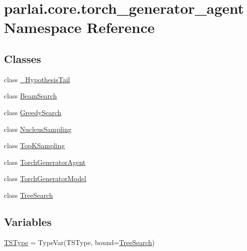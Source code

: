 \hypertarget{namespaceparlai_1_1core_1_1torch__generator__agent}{}\section{parlai.\+core.\+torch\+\_\+generator\+\_\+agent Namespace Reference}
\label{namespaceparlai_1_1core_1_1torch__generator__agent}
\subsection*{Classes}
\begin{DoxyCompactItemize}
\item 
class \hyperlink{classparlai_1_1core_1_1torch__generator__agent_1_1__HypothesisTail}{\+\_\+\+Hypothesis\+Tail}
\item 
class \hyperlink{classparlai_1_1core_1_1torch__generator__agent_1_1BeamSearch}{Beam\+Search}
\item 
class \hyperlink{classparlai_1_1core_1_1torch__generator__agent_1_1GreedySearch}{Greedy\+Search}
\item 
class \hyperlink{classparlai_1_1core_1_1torch__generator__agent_1_1NucleusSampling}{Nucleus\+Sampling}
\item 
class \hyperlink{classparlai_1_1core_1_1torch__generator__agent_1_1TopKSampling}{Top\+K\+Sampling}
\item 
class \hyperlink{classparlai_1_1core_1_1torch__generator__agent_1_1TorchGeneratorAgent}{Torch\+Generator\+Agent}
\item 
class \hyperlink{classparlai_1_1core_1_1torch__generator__agent_1_1TorchGeneratorModel}{Torch\+Generator\+Model}
\item 
class \hyperlink{classparlai_1_1core_1_1torch__generator__agent_1_1TreeSearch}{Tree\+Search}
\end{DoxyCompactItemize}
\subsection*{Variables}
\begin{DoxyCompactItemize}
\item 
\hyperlink{namespaceparlai_1_1core_1_1torch__generator__agent_a0526ff67eb4bc600cb8caa4a561ebb6f}{T\+S\+Type} = Type\+Var(\textquotesingle{}T\+S\+Type\textquotesingle{}, bound=\textquotesingle{}\hyperlink{classparlai_1_1core_1_1torch__generator__agent_1_1TreeSearch}{Tree\+Search}\textquotesingle{})
\end{DoxyCompactItemize}


